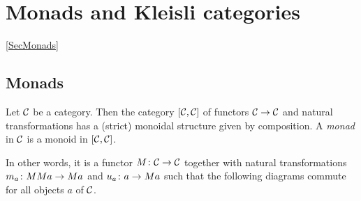 \documentclass{article}
\begin{document}
\section{Monads and Kleisli categories}
\ref{SecMonads}

\subsection{Monads}

Let ${\mathcal{C}}$ be a category.  
Then the category $[{\mathcal{C}},{\mathcal{C}}]$ of functors ${\mathcal{C}}\to{\mathcal{C}}$ and natural transformations has a (strict) monoidal structure given by composition.  
A \emph{monad} \cite[\sec VI]{WorkingMathematician} in ${\mathcal{C}}$ is a monoid in $[{\mathcal{C}},{\mathcal{C}}]$.

In other words, it is a functor $M\colon {\mathcal{C}}\to{\mathcal{C}}$ together with natural  transformations $m_a \colon MMa \to Ma$ and $u_a \colon a \to Ma$ such that the following diagrams commute for all objects $a$ of ${\mathcal{C}}$.

\end{document}
